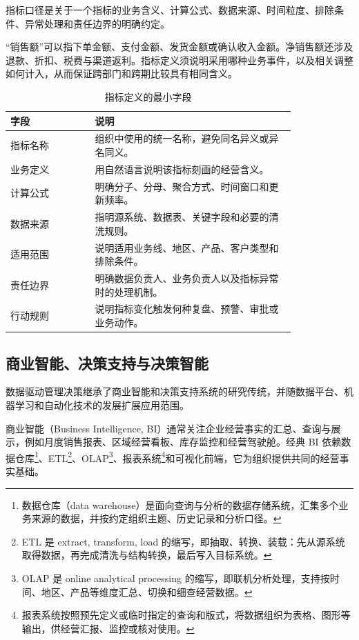 \begin{definition}[指标口径]
指标口径是关于一个指标的业务含义、计算公式、数据来源、时间粒度、排除条件、异常处理和责任边界的明确约定。
\end{definition}

“销售额”可以指下单金额、支付金额、发货金额或确认收入金额。净销售额还涉及退款、折扣、税费与渠道返利。指标定义须说明采用哪种业务事件，以及相关调整如何计入，从而保证跨部门和跨期比较具有相同含义。

\begin{table}[htbp]
\centering
\caption{指标定义的最小字段}
\begin{tabular}{P{0.24\linewidth}P{0.58\linewidth}}
\toprule
{}
字段 & 说明\\
\midrule
指标名称 & 组织中使用的统一名称，避免同名异义或异名同义。\\
业务定义 & 用自然语言说明该指标刻画的经营含义。\\
计算公式 & 明确分子、分母、聚合方式、时间窗口和更新频率。\\
数据来源 & 指明源系统、数据表、关键字段和必要的清洗规则。\\
适用范围 & 说明适用业务线、地区、产品、客户类型和排除条件。\\
责任边界 & 明确数据负责人、业务负责人以及指标异常时的处理机制。\\
行动规则 & 说明指标变化触发何种复盘、预警、审批或业务动作。\\
\bottomrule
\end{tabular}
\end{table}

\subsection{商业智能、决策支持与决策智能}

数据驱动管理决策继承了商业智能和决策支持系统的研究传统，并随数据平台、机器学习和自动化技术的发展扩展应用范围。

商业智能（Business Intelligence, BI）通常关注企业经营事实的汇总、查询与展示，例如月度销售报表、区域经营看板、库存监控和经营驾驶舱。经典 BI 依赖数据仓库\footnote{数据仓库（data warehouse）是面向查询与分析的数据存储系统，汇集多个业务来源的数据，并按约定组织主题、历史记录和分析口径。}、ETL\footnote{ETL 是 extract, transform, load 的缩写，即抽取、转换、装载：先从源系统取得数据，再完成清洗与结构转换，最后写入目标系统。}、OLAP\footnote{OLAP 是 online analytical processing 的缩写，即联机分析处理，支持按时间、地区、产品等维度汇总、切换和细查经营数据。}、报表系统\footnote{报表系统按照预先定义或临时指定的查询和版式，将数据组织为表格、图形等输出，供经营汇报、监控或核对使用。}和可视化前端，它为组织提供共同的经营事实基础。

